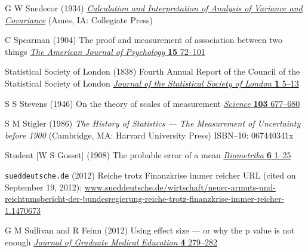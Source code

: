 \begin{thebibliography}{99}
G W Snedecor
(1934) 
\href{http://dx.doi.org/10.1037/13308-000}{\textit{Calculation 
and Interpretation of Analysis of Variance and Covariance}}
(Ames, IA: Collegiate Press)


C Spearman
(1904) The proof and measurement of association between two things
\href{http://www.jstor.org/stable/1412159}{\textit{The Ameri\-can 
Journal of Psychology} \textbf{15} 72--101}

Statistical Society of London
(1838) Fourth Annual Report of the Council of the Statistical 
Society of London
\href{http://www.jstor.org/stable/2337850}{\textit{Journal of the 
Statistical Society of London} \textbf{1} 5--13}

S S Stevens
(1946) On the theory of scales of measurement
\href{https://doi.org/10.1126/science.103.2684.677}{\textit{Science}
\textbf{103} 677--680}

S M Stigler
(1986) \textit{The History of Statistics --- The Measurement of 
Uncertainty before 1900} (Cambridge, MA: Harvard University 
Press)
ISBN--10: 067440341x

Student [W S Gosset]
(1908) The probable error of a mean
\href{http://dx.doi.org/10.1093/biomet/6.1.1}{\textit{Biometrika} 
\textbf{6} 1--25}

{\tt sueddeutsche.de} (2012)
Reiche trotz Finanzkrise immer reicher
URL (cited on September 19, 2012):
\href{http://www.sueddeutsche.de/wirtschaft/neuer-armuts-und-reichtumsbericht-der-bundesregierung-reiche-trotz-finanzkrise-immer-reicher-1.1470673}{www.sueddeutsche.de/wirtschaft/neuer-armuts-und-reichtumsbericht-der-bundesregierung-reiche-trotz-finanzkrise-immer-reicher-1.1470673}

G M Sullivan and R Feinn
(2012) Using effect size --- or why the p value is not enough
\href{https://doi.org/10.4300/JGME-D-12-00156.1}{\textit{Journal of
Graduate Medical Education} \textbf{4} 279--282}


\end{thebibliography}
